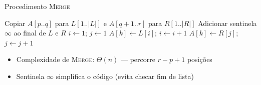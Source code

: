 \documentclass[aspectratio=169]{beamer}
\begin{document}
\begin{frame}[fragile,shrink=5]{Procedimento \textsc{Merge}}
  \begin{algorithm}[H]
    \caption{\textsc{Merge}$(A, p, q, r)$}
    \begin{algorithmic}[1]
      \State Copiar $A[p..q]$ para $L[1..|L|]$ e $A[q{+}1..r]$ para $R[1..|R|]$
      \State Adicionar sentinela $\infty$ ao final de $L$ e $R$
      \State $i \gets 1$; \; $j \gets 1$
          \State $A[k] \gets L[i]$; \; $i \gets i + 1$
        \Else
          \State $A[k] \gets R[j]$; \; $j \gets j + 1$
        \EndIf
      \EndFor
    \end{algorithmic}
  \end{algorithm}

  \vspace{4pt}
  \begin{itemize}
    \item Complexidade de \textsc{Merge}: $\Theta(n)$ — percorre $r - p + 1$ posições
    \item Sentinela $\infty$ simplifica o código (evita checar fim de lista)
  \end{itemize}
\end{frame}
\end{document}
